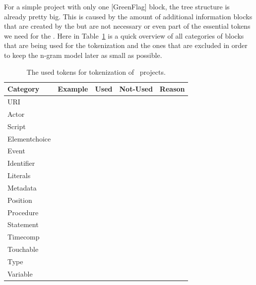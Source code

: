 For a simple \scratch{} project with only one [GreenFlag] block, the tree structure is already pretty big. This is caused by the amount of additional information blocks that are created by the \litterbox{} \AST{} but are not necessary or even part of the essential tokens we need for the \ngram{}. Here in Table~\ref{tab:tokens} is a quick overview of all categories of blocks that are being used for the tokenization and the ones that are excluded in order to keep the n-gram model later as small as possible.   

\begin{table}[H]
    \caption[The used tokens for the n-gram model]{\label{tab:tokens}The used tokens for tokenization of \scratch\ projects.}

    \begin{tabular}[t]{lllll}
        \toprule
        Category & Example & Used & Not-Used & Reason \\
        \midrule
        \vspace{10pt}
        URI & & & & \\
        \vspace{10pt}
        Actor & & & & \\
        \vspace{10pt}
        Script & & & & \\
        \vspace{10pt}
        Elementchoice & & & & \\
        \vspace{10pt}
        Event & & & & \\
        \vspace{10pt}
        Identifier & & & & \\
        \vspace{10pt}
        Literals & & & & \\
        \vspace{10pt}
        Metadata & & & & \\
        \vspace{10pt}
        Position & & & & \\
        \vspace{10pt}
        Procedure & & & & \\
        \vspace{10pt}
        Statement & & & & \\
        \vspace{10pt}
        Timecomp & & & & \\
        \vspace{10pt}
        Touchable & & & & \\
        \vspace{10pt}
        Type & & & & \\
        \vspace{10pt}
        Variable & & & & \\   

        \bottomrule
    \end{tabular}
\end{table}

